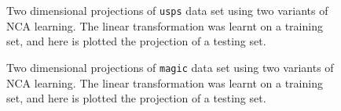      \begin{figure}
		 \centering
			    \hspace{0.02\textwidth}
		\caption{Two dimensional projections of \texttt{usps} data set using two variants of NCA learning. The linear transformation was learnt on a training set, and here is plotted the projection of a testing set.}
		\label{fig:usps-projection}
	\end{figure}

     \begin{figure}
		 \centering
			    \hspace{0.02\textwidth}
		\caption{Two dimensional projections of \texttt{magic} data set using two variants of NCA learning. The linear transformation was learnt on a training set, and here is plotted the projection of a testing set.}
		\label{fig:magic-projection}
	\end{figure}

